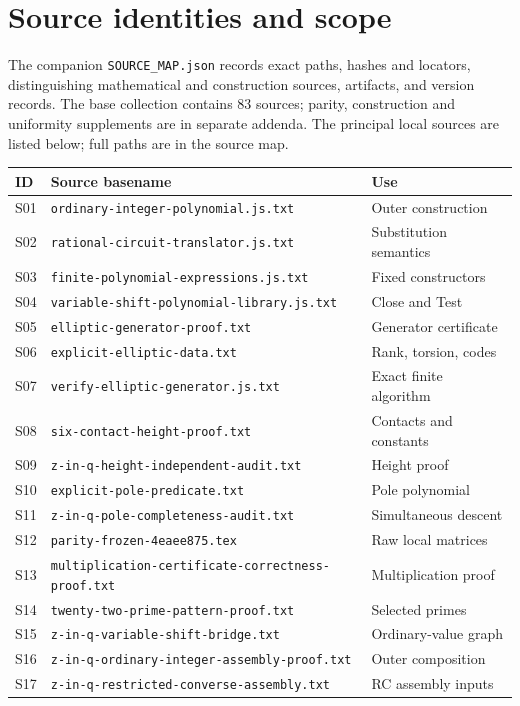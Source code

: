 \documentclass[11pt]{article}
\theoremstyle{definition}
\theoremstyle{remark}
\begin{document}
\section{Source identities and scope}\label{app:sources}
The companion \texttt{SOURCE\_MAP.json} records exact paths, hashes and
locators, distinguishing mathematical and construction sources, artifacts,
and version records. The base collection contains 83 sources; parity, construction
and uniformity supplements are in separate addenda. The principal local
sources are listed below; full paths
are in the source map.
\begin{longtable}{p{}p{}p{}}
\toprule ID & Source basename & Use\\\midrule\endhead
S01 & \texttt{ordinary-integer-polynomial.js.txt} & Outer construction\\
S02 & \texttt{rational-circuit-translator.js.txt} & Substitution semantics\\
S03 & \texttt{finite-polynomial-expressions.js.txt} & Fixed constructors\\
S04 & \texttt{variable-shift-polynomial-library.js.txt} & Close and Test\\
S05 & \texttt{elliptic-generator-proof.txt} & Generator certificate\\
S06 & \texttt{explicit-elliptic-data.txt} & Rank, torsion, codes\\
S07 & \texttt{verify-elliptic-generator.js.txt} & Exact finite algorithm\\
S08 & \texttt{six-contact-height-proof.txt} & Contacts and constants\\
S09 & \texttt{z-in-q-height-independent-audit.txt} & Height proof\\
S10 & \texttt{explicit-pole-predicate.txt} & Pole polynomial\\
S11 & \texttt{z-in-q-pole-completeness-audit.txt} & Simultaneous descent\\
S12 & \texttt{parity-frozen-4eaee875.tex} & Raw local matrices\\
S13 & \nolinkurl{multiplication-certificate-correctness-proof.txt} & Multiplication proof\\
S14 & \texttt{twenty-two-prime-pattern-proof.txt} & Selected primes\\
S15 & \texttt{z-in-q-variable-shift-bridge.txt} & Ordinary-value graph\\
S16 & \texttt{z-in-q-ordinary-integer-assembly-proof.txt} & Outer composition\\
S17 & \texttt{z-in-q-restricted-converse-assembly.txt} & RC assembly inputs\\

\end{longtable}
\end{document}
